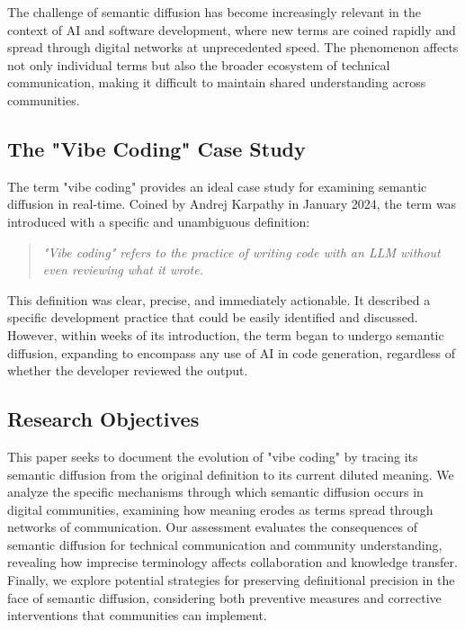 \documentclass[11pt]{article}
\begin{document}
The challenge of semantic diffusion has become increasingly relevant in the context of AI and software development, where new terms are coined rapidly and spread through digital networks at unprecedented speed. The phenomenon affects not only individual terms but also the broader ecosystem of technical communication, making it difficult to maintain shared understanding across communities.

\subsection{The "Vibe Coding" Case Study}

The term "vibe coding" provides an ideal case study for examining semantic diffusion in real-time. Coined by Andrej Karpathy in January 2024, the term was introduced with a specific and unambiguous definition:

\begin{quote}
\emph{"Vibe coding" refers to the practice of writing code with an LLM without even reviewing what it wrote.}
\end{quote}

This definition was clear, precise, and immediately actionable. It described a specific development practice that could be easily identified and discussed. However, within weeks of its introduction, the term began to undergo semantic diffusion, expanding to encompass any use of AI in code generation, regardless of whether the developer reviewed the output.

\subsection{Research Objectives}

This paper seeks to document the evolution of "vibe coding" by tracing its semantic diffusion from the original definition to its current diluted meaning. We analyze the specific mechanisms through which semantic diffusion occurs in digital communities, examining how meaning erodes as terms spread through networks of communication. Our assessment evaluates the consequences of semantic diffusion for technical communication and community understanding, revealing how imprecise terminology affects collaboration and knowledge transfer. Finally, we explore potential strategies for preserving definitional precision in the face of semantic diffusion, considering both preventive measures and corrective interventions that communities can implement.
\end{document}
